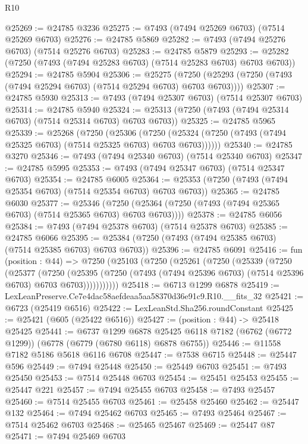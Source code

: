 \begin{lexlean}{R10}
\begin{coremodule}
@25269 := @24785 @3236
@25275 := @7493 (@7494 @25269 @6703) (@7514 @25269 @6703)
@25276 := @24785 @5869
@25282 := @7493 (@7494 @25276 @6703) (@7514 @25276 @6703)
@25283 := @24785 @5879
@25293 := @25282 (@7250 (@7493 (@7494 @25283 @6703) (@7514 @25283 @6703) @6703 @6703))
@25294 := @24785 @5904
@25306 := @25275
    (@7250 (@25293 (@7250 (@7493 (@7494 @25294 @6703) (@7514 @25294 @6703) @6703 @6703))))
@25307 := @24785 @5930
@25313 := @7493 (@7494 @25307 @6703) (@7514 @25307 @6703)
@25314 := @24785 @5940
@25324 := @25313 (@7250 (@7493 (@7494 @25314 @6703) (@7514 @25314 @6703) @6703 @6703))
@25325 := @24785 @5965
@25339 := @25268
    (@7250
      (@25306
        (@7250 (@25324 (@7250 (@7493 (@7494 @25325 @6703) (@7514 @25325 @6703) @6703 @6703))))))
@25340 := @24785 @3270
@25346 := @7493 (@7494 @25340 @6703) (@7514 @25340 @6703)
@25347 := @24785 @5995
@25353 := @7493 (@7494 @25347 @6703) (@7514 @25347 @6703)
@25354 := @24785 @6005
@25364 := @25353 (@7250 (@7493 (@7494 @25354 @6703) (@7514 @25354 @6703) @6703 @6703))
@25365 := @24785 @6030
@25377 := @25346
    (@7250 (@25364 (@7250 (@7493 (@7494 @25365 @6703) (@7514 @25365 @6703) @6703 @6703))))
@25378 := @24785 @6056
@25384 := @7493 (@7494 @25378 @6703) (@7514 @25378 @6703)
@25385 := @24785 @6066
@25395 := @25384 (@7250 (@7493 (@7494 @25385 @6703) (@7514 @25385 @6703) @6703 @6703))
@25396 := @24785 @6091
@25416 := fun (position : @44) =>
  @7250
    (@25103
      (@7250
        (@25261
          (@7250
            (@25339
              (@7250
                (@25377
                  (@7250
                    (@25395
                      (@7250 (@7493 (@7494 @25396 @6703) (@7514 @25396 @6703) @6703 @6703)))))))))))
@25418 := @6713 @1299 @6878
@25419 := LexLeanPreserve.Ce7e4dac58aefdeaa5aa58370d36e91c9.R10.__fits_32
@25421 := @6723 (@25419 @6516)
@25422 := LexLeanStd.Sha256.roundConstant
@25425 := @25421 (@605 (@25422 @6516))
@25427 := (position : @44) -> @25418 @25425
@25441 := @6737
    @1299
    @6878
    @25425
    @6118
    @7182
    (@6762 (@6772 @1299))
    (@6778 (@6779 (@6780 @6118) @6878 @6755))
@25446 := @11558 @7182 @5186 @5618 @6116 @6708
@25447 := @7538 @6715
@25448 := @25447 @596
@25449 := @7494 @25448
@25450 := @25449 @6703
@25451 := @7493 @25450
@25453 := @7514 @25448 @6703
@25454 := @25451 @25453
@25455 := @25447 @221
@25457 := @7494 @25455 @6703
@25458 := @7493 @25457
@25460 := @7514 @25455 @6703
@25461 := @25458 @25460
@25462 := @25447 @132
@25464 := @7494 @25462 @6703
@25465 := @7493 @25464
@25467 := @7514 @25462 @6703
@25468 := @25465 @25467
@25469 := @25447 @87
@25471 := @7494 @25469 @6703

\end{coremodule}
\end{lexlean}
